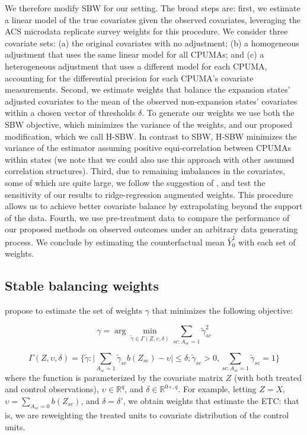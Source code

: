 \documentclass[aoas]{imsart}
\theoremstyle{plain}
\theoremstyle{remark}
\begin{document}
We therefore modify SBW for our setting. The broad steps are: first, we estimate a linear model of the true covariates given the observed covariates, leveraging the ACS microdata replicate survey weights for this procedure. We consider three covariate sets: (a) the original covariates with no adjustment; (b) a homogeneous adjustment that uses the same linear model for all CPUMAs; and (c) a heterogeneous adjustment that uses a different model for each CPUMA, accounting for the differential precision for each CPUMA's covariate measurements. Second, we estimate weights that balance the expansion states' adjusted covariates to the mean of the observed non-expansion states' covariates within a chosen vector of thresholds $\delta$. To generate our weights we use both the SBW objective, which minimizes the variance of the weights, and our proposed modification, which we call H-SBW. In contrast to SBW, H-SBW minimizes the variance of the estimator assuming positive equi-correlation between CPUMAs within states (we note that we could also use this approach with other assumed correlation structures). Third, due to remaining imbalances in the covariates, some of which are quite large, we follow the suggestion of \cite{ben2018augmented}, and test the sensitivity of our results to ridge-regression augmented weights. This procedure allows us to achieve better covariate balance by extrapolating beyond the support of the data. Fourth, we use pre-treatment data to compare the performance of our proposed methods on observed outcomes under an arbitrary data generating process. We conclude by estimating the counterfactual mean $\bar{Y}^1_0$ with each set of weights.

\subsection{Stable balancing weights}

\cite{zubizarreta2015stable} propose to estimate the set of weights $\gamma$ that minimizes the following objective:

\begin{equation}\label{eqn:sbwobjective}
\gamma = \arg\min_{\tilde{\gamma} \in \Gamma(Z, \upsilon, \delta)} \sum_{sc: A_{sc} = 1} \tilde{\gamma}_{sc}^2
\end{equation}

\begin{equation}\label{eqn:constraint}
\Gamma(Z, \upsilon, \delta) = \{\tilde{\gamma}: \lvert \sum_{A_{sc} = 1}\tilde{\gamma}_{sc} b(Z_{sc}) - \upsilon \lvert \le \delta; \tilde{\gamma}_{sc} > 0, \sum_{sc: A_{sc} = 1}\tilde{\gamma}_{sc} = 1\}
\end{equation}
%
where the function is parameterized by the covariate matrix $Z$ (with both treated and control observations), $\upsilon \in \mathbb{R}^q$, and $\delta \in \mathbb{R}^{0+, q}$. For example, letting $Z = X$, $\upsilon = \sum_{A_{sc} = 0}b(Z_{sc})$, and $\delta = \delta'$, we obtain weights that estimate the ETC: that is, we are reweighting the treated units to covariate distribution of the control units.
\end{document}
